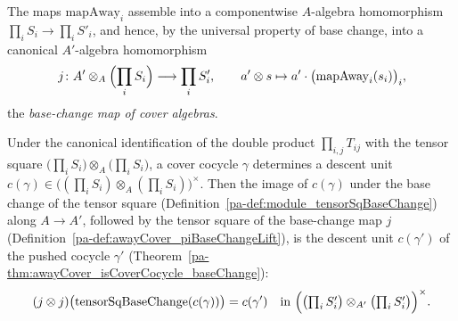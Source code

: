 \begin{definition}
  \label{pa-def:awayCover_piBaseChangeLift}
  \leanok

  The maps \(\mathrm{mapAway}_i\) assemble into a componentwise \(A\)-algebra homomorphism
  \(\prod_i S_i \to \prod_i S'_i\), and hence, by the universal property of base change, into a
  canonical \(A'\)-algebra homomorphism
  \[
    j \colon A' \otimes_A \Bigl(\prod_i S_i\Bigr) \longrightarrow \prod_i S'_i, \qquad
    a' \otimes s \mapsto a' \cdot \bigl(\mathrm{mapAway}_i(s_i)\bigr)_i,
  \]
  the \emph{base-change map of cover algebras}.
\end{definition}

\begin{theorem}
  \label{pa-thm:awayCover_cocycleUnit_baseChange}
  \leanok

  Under the canonical identification of the double product \(\prod_{i,j} T_{ij}\) with the
  tensor square \(\bigl(\prod_i S_i\bigr) \otimes_A \bigl(\prod_i S_i\bigr)\), a cover cocycle
  \(\gamma\) determines a descent unit \(c(\gamma) \in \bigl((\prod_i S_i) \otimes_A (\prod_i
  S_i)\bigr)^{\times}\).  Then the image of \(c(\gamma)\) under the base change of the tensor
  square (Definition~\ref{pa-def:module_tensorSqBaseChange}) along \(A \to A'\), followed by the
  tensor square of the base-change map \(j\)
  (Definition~\ref{pa-def:awayCover_piBaseChangeLift}), is the descent unit \(c(\gamma')\) of the
  pushed cocycle \(\gamma'\) (Theorem~\ref{pa-thm:awayCover_isCoverCocycle_baseChange}):
  \[
    (j \otimes j)\bigl(\mathrm{tensorSqBaseChange}(c(\gamma))\bigr) = c(\gamma')
    \quad\text{in }\Bigl(\bigl(\textstyle\prod_i S'_i\bigr) \otimes_{A'} \bigl(\prod_i
    S'_i\bigr)\Bigr)^{\times}.
  \]
\end{theorem}
